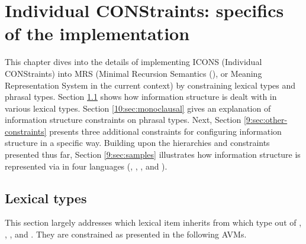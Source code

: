 \chapter{Individual CONStraints: specifics of the implementation}
\label{chapter10}
\setcounter{enums}{0}


This chapter dives into the details of implementing ICONS (Individual
CONStraints) into MRS (Minimal Recursion
Semantics (\citealt{copestake:etal:05}), or Meaning
Representation System in the current context) by constraining lexical
types and phrasal types. Section \ref{10:sec:lexical} shows how information
structure is dealt with in various lexical types.
Section \ref{10:sec:monoclausal} gives an explanation of information structure
constraints on phrasal types. Next, Section \ref{9:sec:other-constraints}
presents three additional constraints for configuring information
structure in a specific way.  Building upon the hierarchies and
constraints presented thus far, Section \ref{9:sec:samples} illustrates how
information structure is represented via  in four languages
(, , , and ).


\section{Lexical types}
\label{10:sec:lexical}


This section largely addresses which lexical item inherits from which
 type out of ,
, , and
. They are constrained as presented in the
following AVMs.


